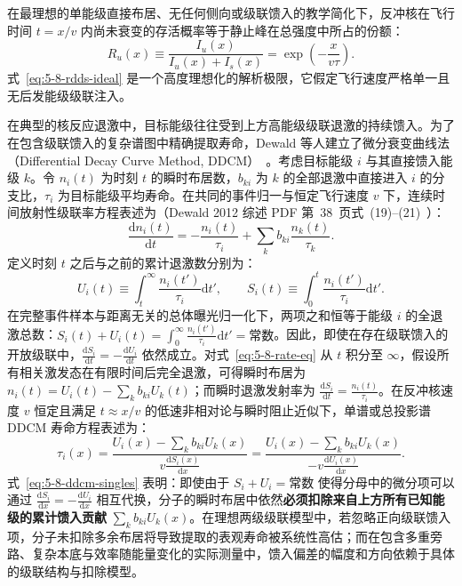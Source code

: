 在最理想的单能级直接布居、无任何侧向或级联馈入的教学简化下，反冲核在飞行时间 $t = x/v$ 内尚未衰变的存活概率等于静止峰在总强度中所占的份额：
\begin{equation}\label{eq:5-8-rdds-ideal}
R_u(x) \equiv \frac{I_u(x)}{I_u(x) + I_s(x)} = \exp\left( - \frac{x}{v \tau} \right).
\end{equation}
式~\eqref{eq:5-8-rdds-ideal} 是一个高度理想化的解析极限，它假定飞行速度严格单一且无后发能级级联注入。

在典型的核反应退激中，目标能级往往受到上方高能级级联退激的持续馈入。为了在包含级联馈入的复杂谱图中精确提取寿命，Dewald 等人建立了微分衰变曲线法（Differential Decay Curve Method, DDCM）~\cite{dewald-2012-ddcm-recoil-distance}。考虑目标能级 $i$ 与其直接馈入能级 $k$。令 $n_i(t)$ 为时刻 $t$ 的瞬时布居数，$b_{ki}$ 为 $k$ 的全部退激中直接进入 $i$ 的分支比，$\tau_i$ 为目标能级平均寿命。在共同的事件归一与恒定飞行速度 $v$ 下，连续时间放射性级联率方程表述为（Dewald 2012 综述 PDF 第~38~页式~(19)–(21)~\cite{dewald-2012-ddcm-recoil-distance}）：
\begin{equation}\label{eq:5-8-rate-eq}
\frac{\mathrm{d}n_i(t)}{\mathrm{d}t} = -\frac{n_i(t)}{\tau_i} + \sum_k b_{ki} \frac{n_k(t)}{\tau_k}.
\end{equation}
定义时刻 $t$ 之后与之前的累计退激数分别为：
\begin{equation}\label{eq:5-8-cum-counts-def}
U_i(t) \equiv \int_t^\infty \frac{n_i(t')}{\tau_i} \mathrm{d}t', \qquad S_i(t) \equiv \int_0^t \frac{n_i(t')}{\tau_i} \mathrm{d}t'.
\end{equation}
在完整事件样本与距离无关的总体曝光归一化下，两项之和恒等于能级 $i$ 的全退激总数：$S_i(t) + U_i(t) = \int_0^\infty \frac{n_i(t')}{\tau_i}\mathrm{d}t' = \text{常数}$。因此，即使在存在级联馈入的开放级联中，$\frac{\mathrm{d}S_i}{\mathrm{d}t} = -\frac{\mathrm{d}U_i}{\mathrm{d}t}$ 依然成立。对式~\eqref{eq:5-8-rate-eq} 从 $t$ 积分至 $\infty$，假设所有相关激发态在有限时间后完全退激，可得瞬时布居为 $n_i(t) = U_i(t) - \sum_k b_{ki} U_k(t)$；而瞬时退激发射率为 $\frac{\mathrm{d}S_i}{\mathrm{d}t} = \frac{n_i(t)}{\tau_i}$。在反冲核速度 $v$ 恒定且满足 $t \approx x/v$ 的低速非相对论与瞬时阻止近似下，单谱或总投影谱 DDCM 寿命方程表述为：
\begin{equation}\label{eq:5-8-ddcm-singles}
\tau_i(x) = \frac{U_i(x) - \sum_k b_{ki} U_k(x)}{v \frac{\mathrm{d} S_i(x)}{\mathrm{d}x}} = \frac{U_i(x) - \sum_k b_{ki} U_k(x)}{-v \frac{\mathrm{d} U_i(x)}{\mathrm{d}x}}.
\end{equation}
式~\eqref{eq:5-8-ddcm-singles} 表明：即使由于 $S_i + U_i = \text{常数}$ 使得分母中的微分项可以通过 $\frac{\mathrm{d}S_i}{\mathrm{d}x} = -\frac{\mathrm{d}U_i}{\mathrm{d}x}$ 相互代换，分子的瞬时布居中依然\textbf{必须扣除来自上方所有已知能级的累计馈入贡献} $\sum_k b_{ki} U_k(x)$。在理想两级级联模型中，若忽略正向级联馈入项，分子未扣除多余布居将导致提取的表观寿命被系统性高估；而在包含多重旁路、复杂本底与效率随能量变化的实际测量中，馈入偏差的幅度和方向依赖于具体的级联结构与扣除模型。

